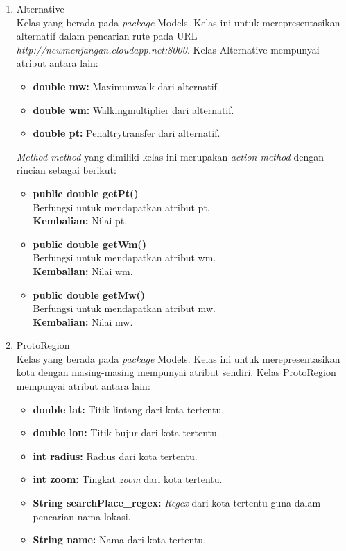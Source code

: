 \begin{enumerate}
	
	\item Alternative\\
	Kelas yang berada pada \textit{package} Models. Kelas ini untuk merepresentasikan alternatif dalam pencarian rute pada URL \textit{http://newmenjangan.cloudapp.net:8000}. Kelas Alternative mempunyai atribut antara lain:
	\begin{itemize}
		\item \textbf{double mw:} Maximumwalk dari alternatif.
		\item \textbf{double wm:} Walkingmultiplier dari alternatif.
		\item \textbf{double pt:}  Penaltrytransfer dari alternatif.
	\end{itemize}
	
	\textit{Method-method} yang dimiliki kelas ini merupakan \textit{action method} dengan rincian sebagai berikut:
	\begin{itemize}
		\item \textbf{public double getPt()}\\
		Berfungsi untuk mendapatkan atribut pt.\\
		\textbf{Kembalian:}  Nilai pt.
		
		\item \textbf{public double getWm()}\\
		Berfungsi untuk mendapatkan atribut wm.\\
		\textbf{Kembalian:}  Nilai wm.
		
		\item \textbf{public double getMw()}\\
		Berfungsi untuk mendapatkan atribut mw.\\
		\textbf{Kembalian:}  Nilai mw.
	\end{itemize}
	
	\item ProtoRegion\\
	Kelas yang berada pada \textit{package} Models. Kelas ini untuk merepresentasikan kota dengan masing-masing mempunyai atribut sendiri. Kelas ProtoRegion mempunyai atribut antara lain:
	\begin{itemize}
		\item \textbf{double lat:} Titik lintang dari kota tertentu.
		\item \textbf{double lon:} Titik bujur dari kota tertentu.
		\item \textbf{int radius:}  Radius dari kota tertentu.
		\item \textbf{int zoom:}  Tingkat \textit{zoom} dari kota tertentu.
		\item \textbf{String searchPlace\_regex:}  \textit{Regex} dari kota tertentu guna dalam pencarian nama lokasi.
		\item \textbf{String name:}  Nama dari kota tertentu.
	\end{itemize}
	

\end{enumerate}
